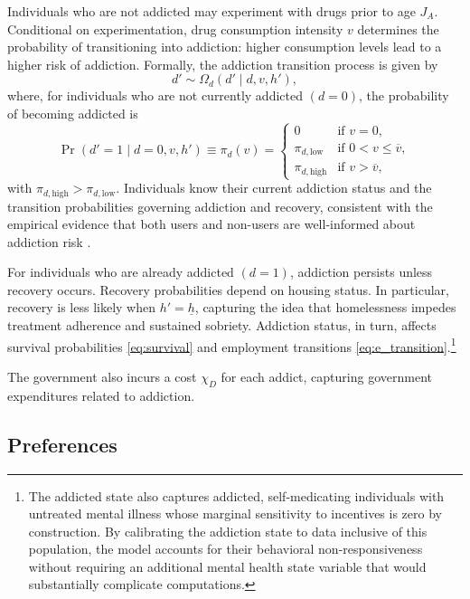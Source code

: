 \documentclass[parskip=full]{article}
\theoremstyle{plain}
\theoremstyle{definition}
\theoremstyle{remark}
\begin{document}
Individuals who are not addicted may experiment with drugs prior to age $J_A$. Conditional on experimentation, drug consumption intensity $v$ determines the probability of transitioning into addiction: higher consumption levels lead to a higher risk of addiction. Formally, the addiction transition process is given by
\begin{equation}
\label{eq:addiction_transition}
d' \sim \Omega_d\!\left(d' \mid d, v, h'\right),
\end{equation}
where, for individuals who are not currently addicted $(d=0)$, the probability of becoming addicted is
\begin{equation}
\label{eq:addiction_probability}
\Pr(d'=1 \mid d=0, v, h') \equiv \pi_d(v) =
\begin{cases}
0  & \text{if } v =0,\\[3pt]
\pi_{d,\text{low}}  & \text{if } 0 < v \le \overline v,\\[3pt]
\pi_{d,\text{high}} & \text{if } v > \overline v,
\end{cases}
\end{equation}
with $\pi_{d,\text{high}} > \pi_{d,\text{low}}$. Individuals know their current addiction status and the transition probabilities governing addiction and recovery, consistent with the empirical evidence that both users and non-users are well-informed about addiction risk \citep{lundborg_lindgren_2002,greenwood_guner_kopecky_2025_downward_spiral}.

For individuals who are already addicted $(d=1)$, addiction persists unless recovery occurs. Recovery probabilities depend on housing status. In particular, recovery is less likely when $h'=\underline h$, capturing the idea that homelessness impedes treatment adherence and sustained sobriety. Addiction status, in turn, affects survival probabilities \eqref{eq:survival} and employment transitions \eqref{eq:e_transition}.\footnote{The addicted state also captures addicted, self-medicating individuals with untreated mental illness whose marginal sensitivity to incentives is zero by construction. By calibrating the addiction state to data inclusive of this population, the model accounts for their behavioral non-responsiveness without requiring an additional mental health state variable that would substantially complicate computations.}

The government also incurs a cost $\chi_{D}$ for each addict, capturing government expenditures related to addiction. 

\subsection{Preferences}\label{sec:pref}
\end{document}

